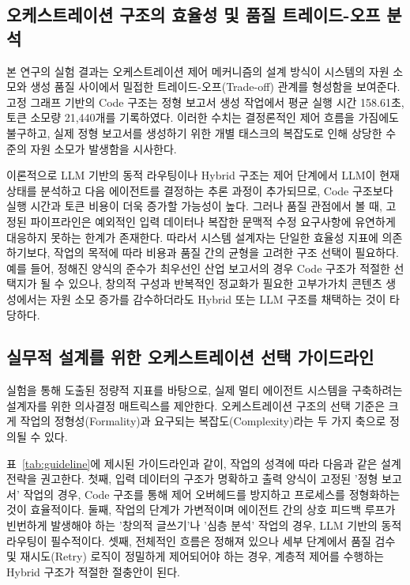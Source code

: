\subsection{오케스트레이션 구조의 효율성 및 품질 트레이드-오프 분석}

본 연구의 실험 결과는 오케스트레이션 제어 메커니즘의 설계 방식이 시스템의 자원 소모와 생성 품질 사이에서 밀접한 트레이드-오프(Trade-off) 관계를 형성함을 보여준다. 고정 그래프 기반의 Code 구조는 정형 보고서 생성 작업에서 평균 실행 시간 158.61초, 토큰 소모량 21,440개를 기록하였다. 이러한 수치는 결정론적인 제어 흐름을 가짐에도 불구하고, 실제 정형 보고서를 생성하기 위한 개별 태스크의 복잡도로 인해 상당한 수준의 자원 소모가 발생함을 시사한다.

이론적으로 LLM 기반의 동적 라우팅이나 Hybrid 구조는 제어 단계에서 LLM이 현재 상태를 분석하고 다음 에이전트를 결정하는 추론 과정이 추가되므로, Code 구조보다 실행 시간과 토큰 비용이 더욱 증가할 가능성이 높다. 그러나 품질 관점에서 볼 때, 고정된 파이프라인은 예외적인 입력 데이터나 복잡한 문맥적 수정 요구사항에 유연하게 대응하지 못하는 한계가 존재한다. 따라서 시스템 설계자는 단일한 효율성 지표에 의존하기보다, 작업의 목적에 따라 비용과 품질 간의 균형을 고려한 구조 선택이 필요하다. 예를 들어, 정해진 양식의 준수가 최우선인 산업 보고서의 경우 Code 구조가 적절한 선택지가 될 수 있으나, 창의적 구성과 반복적인 정교화가 필요한 고부가가치 콘텐츠 생성에서는 자원 소모 증가를 감수하더라도 Hybrid 또는 LLM 구조를 채택하는 것이 타당하다.

\subsection{실무적 설계를 위한 오케스트레이션 선택 가이드라인}

실험을 통해 도출된 정량적 지표를 바탕으로, 실제 멀티 에이전트 시스템을 구축하려는 설계자를 위한 의사결정 매트릭스를 제안한다. 오케스트레이션 구조의 선택 기준은 크게 작업의 정형성(Formality)과 요구되는 복잡도(Complexity)라는 두 가지 축으로 정의될 수 있다.

표~\ref{tab:guideline}에 제시된 가이드라인과 같이, 작업의 성격에 따라 다음과 같은 설계 전략을 권고한다. 첫째, 입력 데이터의 구조가 명확하고 출력 양식이 고정된 '정형 보고서' 작업의 경우, Code 구조를 통해 제어 오버헤드를 방지하고 프로세스를 정형화하는 것이 효율적이다. 둘째, 작업의 단계가 가변적이며 에이전트 간의 상호 피드백 루프가 빈번하게 발생해야 하는 '창의적 글쓰기'나 '심층 분석' 작업의 경우, LLM 기반의 동적 라우팅이 필수적이다. 셋째, 전체적인 흐름은 정해져 있으나 세부 단계에서 품질 검수 및 재시도(Retry) 로직이 정밀하게 제어되어야 하는 경우, 계층적 제어를 수행하는 Hybrid 구조가 적절한 절충안이 된다.

